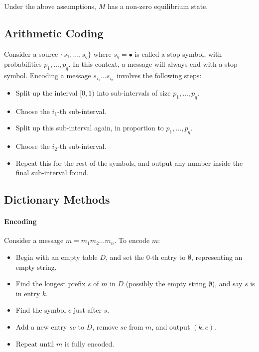Under the above assumptions, \(M\) has a non-zero equilibrium state.

\subsection{Arithmetic Coding}
Consider a source \(\{s_1, \dots, s_q\}\) where \(s_q = \bullet\) is called a stop symbol, with probabilities \(p_1, \dots, p_q\). In this context, a message will always end with a stop symbol. Encoding a message \(s_i_1 \dots s_i_n\) involves the following steps:
\begin{itemize}
    \item Split up the interval \([0, 1)\) into sub-intervals of size \(p_1, \dots, p_q\).
    \item Choose the \(i_1\)-th sub-interval.
    \item Split up this sub-interval again, in proportion to \(p_1, \dots, p_q\).
    \item Choose the \(i_2\)-th sub-interval.
    \item Repeat this for the rest of the symbols, and output any number inside the final sub-interval found.
\end{itemize}

\subsection{Dictionary Methods}
\paragraph{Encoding}
Consider a message \(m = m_1m_2 \dots m_n\). To encode \(m\):
\begin{itemize}
    \item Begin with an empty table \(D\), and set the 0-th entry to \(\emptyset\), representing an empty string.
    \item Find the longest prefix \(s\) of \(m\) in \(D\) (possibly the empty string \(\emptyset\)), and say \(s\) is in entry \(k\).
    \item Find the symbol \(c\) just after \(s\).
    \item Add a new entry \(sc\) to \(D\), remove \(sc\) from \(m\), and output \((k, c)\).
    \item Repeat until \(m\) is fully encoded.
\end{itemize}

